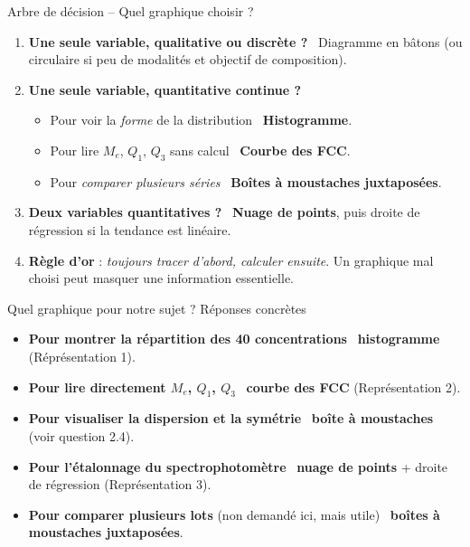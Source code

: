 \documentclass[11pt,a4paper]{article}
\begin{document}
\begin{vignetteMethode}{Arbre de décision -- Quel graphique choisir ?}
\begin{enumerate}[leftmargin=*,itemsep=2pt]
  \item \textbf{Une seule variable, qualitative ou discrète ?} \textrightarrow\ Diagramme en bâtons (ou circulaire si peu de modalités et objectif de composition).
  \item \textbf{Une seule variable, quantitative continue ?}
    \begin{itemize}[leftmargin=*,itemsep=1pt]
      \item Pour voir la \emph{forme} de la distribution \textrightarrow\ \textbf{Histogramme}.
      \item Pour lire $M_e$, $Q_1$, $Q_3$ sans calcul \textrightarrow\ \textbf{Courbe des FCC}.
      \item Pour \emph{comparer plusieurs séries} \textrightarrow\ \textbf{Boîtes à moustaches juxtaposées}.
    \end{itemize}
  \item \textbf{Deux variables quantitatives ?} \textrightarrow\ \textbf{Nuage de points}, puis droite de régression si la tendance est linéaire.
  \item \textbf{Règle d'or} : \emph{toujours tracer d'abord, calculer ensuite}. Un graphique mal choisi peut masquer une information essentielle.
\end{enumerate}
\end{vignetteMethode}

\vspace{0.3cm}

\begin{vignetteMethode}{Quel graphique pour notre sujet ? Réponses concrètes}
\begin{itemize}[leftmargin=*,itemsep=2pt]
  \item \textbf{Pour montrer la répartition des 40 concentrations} \textrightarrow\ \textbf{histogramme} (Réprésentation 1).
  \item \textbf{Pour lire directement $M_e$, $Q_1$, $Q_3$} \textrightarrow\ \textbf{courbe des FCC} (Représentation 2).
  \item \textbf{Pour visualiser la dispersion et la symétrie} \textrightarrow\ \textbf{boîte à moustaches} (voir question 2.4).
  \item \textbf{Pour l'étalonnage du spectrophotomètre} \textrightarrow\ \textbf{nuage de points} + droite de régression (Représentation 3).
  \item \textbf{Pour comparer plusieurs lots} (non demandé ici, mais utile) \textrightarrow\ \textbf{boîtes à moustaches juxtaposées}.
\end{itemize}
\end{vignetteMethode}
\end{document}
